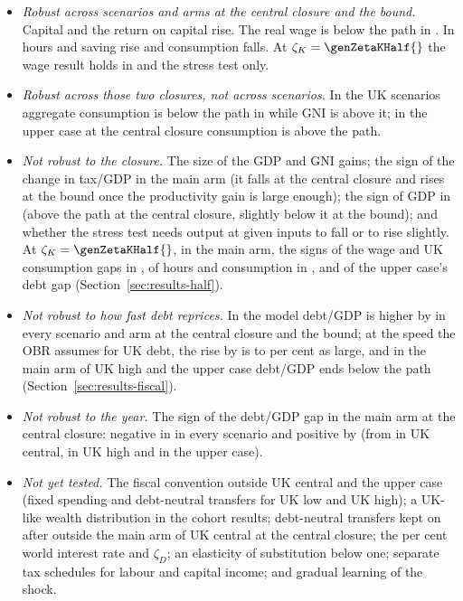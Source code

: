 \begin{itemize}
\item \emph{Robust across scenarios and arms at the central closure and the bound.} Capital and the return on capital rise. The real wage is below the path in \genHeadYear{}. In \genShockYear{} hours and saving rise and consumption falls. At $\zetaK = \genZetaKHalf{}$ the wage result holds in \Flat{} and the stress test only.
\item \emph{Robust across those two closures, not across scenarios.} In the UK scenarios aggregate consumption is below the path in \genHeadYear{} while GNI is above it; in the upper case at the central closure consumption is above the path.
\item \emph{Not robust to the closure.} The size of the GDP and GNI gains; the sign of the change in tax/GDP in the main arm (it falls at the central closure and rises at the bound once the productivity gain is large enough); the sign of GDP in \Flat{} (above the path at the central closure, slightly below it at the bound); and whether the stress test needs output at given inputs to fall or to rise slightly. At $\zetaK = \genZetaKHalf{}$, in the main arm, the signs of the wage and UK consumption gaps in \genHeadYear{}, of hours and consumption in \genShockYear{}, and of the upper case's \genDebtRuleYear{} debt gap (Section~\ref{sec:results-half}).
\item \emph{Not robust to how fast debt reprices.} In the model debt/GDP is higher by \genDebtRuleYear{} in every scenario and arm at the central closure and the bound; at the speed the OBR assumes for UK debt, the rise by \genDebtRuleYear{} is \genRepriceRatioMinPct{} to \genRepriceRatioMaxPct{} per cent as large, and in the main arm of UK high and the upper case debt/GDP ends below the path (Section~\ref{sec:results-fiscal}).
\item \emph{Not robust to the year.} The sign of the debt/GDP gap in the main arm at the central closure: negative in \genHeadYear{} in every scenario and positive by \genDebtRuleYear{} (from \genUkCentralMainDebtFirstPosCentral{} in UK central, \genUkHighMainDebtFirstPosCentral{} in UK high and \genKorinekMainDebtFirstPosCentral{} in the upper case).
\item \emph{Not yet tested.} The fiscal convention outside UK central and the upper case (fixed spending and debt-neutral transfers for UK low and UK high); a UK-like wealth distribution in the cohort results; debt-neutral transfers kept on after \genLastFlowYear{} outside the main arm of UK central at the central closure; the \genWorldRatePct{} per cent world interest rate and $\zeta_D$; an elasticity of substitution below one; separate tax schedules for labour and capital income; and gradual learning of the shock.
\end{itemize}

